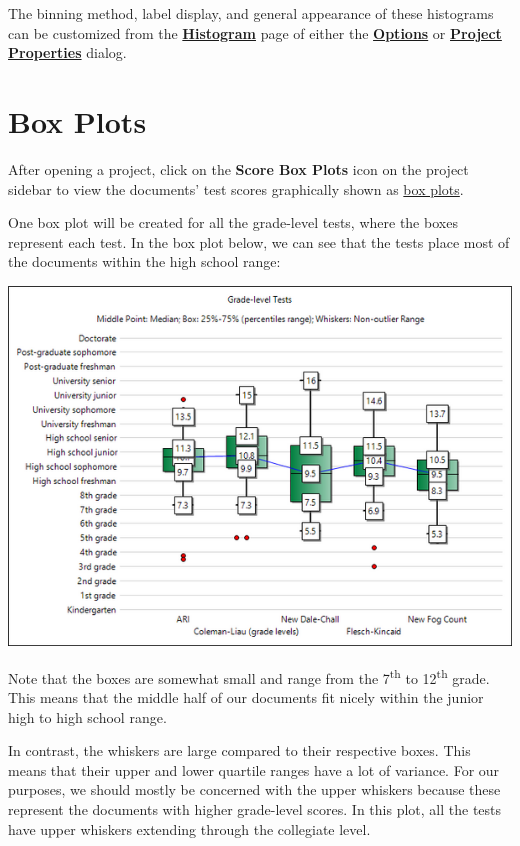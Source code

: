 \documentclass[
]{book}
\theoremstyle{definition}
\theoremstyle{definition}
\theoremstyle{definition}
\theoremstyle{definition}
\theoremstyle{remark}
\begin{document}
The binning method, label display, and general appearance of these histograms can be customized from the \protect\hyperlink{options-histograms}{\textbf{Histogram}} page of either the \protect\hyperlink{options-overview}{\textbf{Options}} or \protect\hyperlink{options-overview}{\textbf{Project Properties}} dialog.

\hypertarget{reviewing-batch-box-plots}{%
\section{Box Plots}\label{reviewing-batch-box-plots}}

After opening a project, click on the \textbf{Score Box Plots} icon on the project sidebar to view the documents' test scores graphically shown as \protect\hyperlink{boxplot}{box plots}.

One box plot will be created for all the grade-level tests, where the boxes represent each test. In the box plot below, we can see that the tests place most of the documents within the high school range:

\includegraphics{Images/boxgrades.png}

Note that the boxes are somewhat small and range from the 7\textsuperscript{th} to 12\textsuperscript{th} grade. This means that the middle half of our documents fit nicely within the junior high to high school range.

In contrast, the whiskers are large compared to their respective boxes. This means that their upper and lower quartile ranges have a lot of variance. For our purposes, we should mostly be concerned with the upper whiskers because these represent the documents with higher grade-level scores. In this plot, all the tests have upper whiskers extending through the collegiate level.
\end{document}
